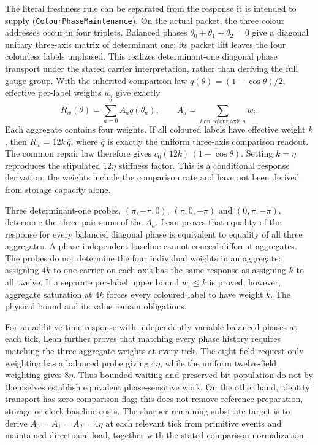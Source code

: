 The literal freshness rule can be separated from the response it is intended to supply (\texttt{ColourPhaseMaintenance}). On the actual packet, the three colour addresses occur in four triplets. Balanced phases $\theta_0+\theta_1+\theta_2=0$ give a diagonal unitary three-axis matrix of determinant one; its packet lift leaves the four colourless labels unphased. This realizes determinant-one diagonal phase transport under the stated carrier interpretation, rather than deriving the full gauge group. With the inherited comparison law $q(\theta)=(1-\cos\theta)/2$, effective per-label weights $w_i$ give exactly
\begin{equation}
 R_w(\theta)=\sum_{a=0}^2 A_a q(\theta_a),
 \qquad A_a=\sum_{i\text{ on colour axis }a}w_i.
\end{equation}
Each aggregate contains four weights. If all coloured labels have effective weight $k$, then $R_w=12k\,\overline q$, where $\overline q$ is exactly the uniform three-axis comparison readout. The common repair law therefore gives $c_0(12k)\,\overline{(1-\cos\theta)}$. Setting $k=\eta$ reproduces the stipulated $12\eta$ stiffness factor. This is a conditional response derivation; the weights include the comparison rate and have not been derived from storage capacity alone.

Three determinant-one probes, $(\pi,-\pi,0)$, $(\pi,0,-\pi)$ and $(0,\pi,-\pi)$, determine the three pair sums of the $A_a$. Lean proves that equality of the response for every balanced diagonal phase is equivalent to equality of all three aggregates. A phase-independent baseline cannot conceal different aggregates. The probes do not determine the four individual weights in an aggregate: assigning $4k$ to one carrier on each axis has the same response as assigning $k$ to all twelve. If a separate per-label upper bound $w_i\le k$ is proved, however, aggregate saturation at $4k$ forces every coloured label to have weight $k$. The physical bound and its value remain obligations.

For an additive time response with independently variable balanced phases at each tick, Lean further proves that matching every phase history requires matching the three aggregate weights at every tick. The eight-field request-only weighting has a balanced probe giving $4\eta$, while the uniform twelve-field weighting gives $8\eta$. Thus bounded waiting and preserved bit population do not by themselves establish equivalent phase-sensitive work. On the other hand, identity transport has zero comparison flag; this does not remove reference preparation, storage or clock baseline costs. The sharper remaining substrate target is to derive $A_0=A_1=A_2=4\eta$ at each relevant tick from primitive events and maintained directional load, together with the stated comparison normalization.

